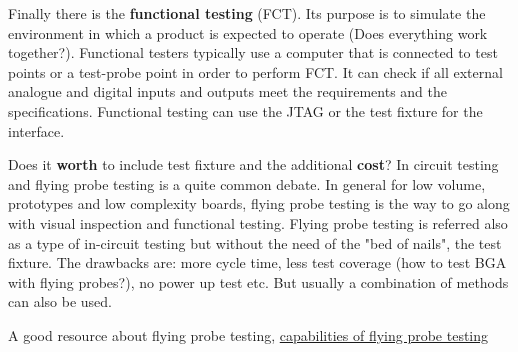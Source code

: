 \documentclass[final]{cubedoc}
\begin{document}
	Finally there is the \textbf{functional testing} (FCT). Its purpose is to simulate the environment in which a product is expected to operate (Does everything work together?). Functional testers typically use a computer that is connected to test points or a test-probe point in order to perform FCT.
	It can check if all external analogue and digital inputs and outputs meet the requirements and the specifications. Functional testing can use the JTAG or the test fixture for the interface. 
	
	
	
	Does it \textbf{worth} to include test fixture and the additional \textbf{cost}? In circuit testing and flying probe testing is a quite common debate. In general for low volume, prototypes and low complexity boards, flying probe testing is the way to go along with visual inspection and functional testing. Flying probe testing is referred also as a type of in-circuit testing but without the need of the "bed of nails", the test fixture. The drawbacks are: more cycle time, less test coverage (how to test BGA with flying probes?), no power up test etc. But usually a combination of methods can also be used. 
	
	
	A good resource about flying probe testing, \href{https://blog.matric.com/flying-probe-test-capabilities}{capabilities of flying probe testing}
	
	
	
	
	
\end{document}
